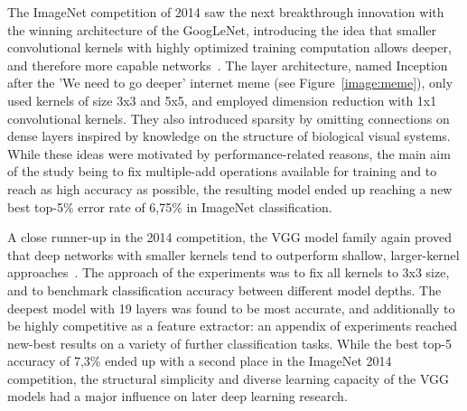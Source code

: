 \documentclass[english,twoside,openright]{UH_DS_MSc}
\begin{document}
The ImageNet competition of 2014 saw the next breakthrough innovation with the winning architecture of the GoogLeNet,
introducing the idea that smaller convolutional kernels with highly optimized training computation allows deeper,
and therefore more capable networks~\cite{googlelenet}. The layer architecture, named Inception after the 'We 
need to go deeper' internet meme (see Figure~\ref{image:meme}), only used kernels of size 3x3 and 5x5, and
employed dimension reduction with 1x1 convolutional kernels. They also introduced sparsity by omitting connections on 
dense layers inspired by knowledge on the structure of biological visual systems. While these ideas were motivated
by performance-related reasons, the main aim of the study being to fix multiple-add operations available for training 
and to reach as high accuracy as possible, the resulting model ended up reaching a new best top-5\% error rate of 6,75\%
in ImageNet classification.

A close runner-up in the 2014 competition, the VGG model family again proved that deep networks 
with smaller kernels tend to outperform shallow, larger-kernel approaches~\cite{vgg}. The approach 
of the experiments was to fix all kernels to 3x3 size, and to benchmark classification accuracy between 
different model depths. The deepest model with 19 layers was found to be most accurate, and additionally 
to be highly competitive as a feature extractor: an appendix of experiments reached new-best results on a variety of 
further classification tasks. While the 
best top-5 accuracy of 7,3\% ended up with a second place in the ImageNet 2014 competition, the structural simplicity
and diverse learning capacity of the VGG models had a major influence on later deep learning research.
\end{document}
